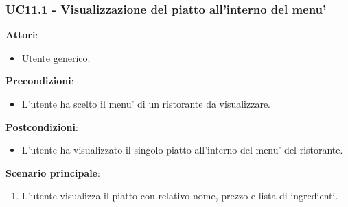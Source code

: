 \subsubsection{UC11.1 - Visualizzazione del piatto all'interno del menu'} \label{usecase:11_1}
\textbf{Attori}:
\begin{itemize}
    \item Utente generico.
\end{itemize}
\textbf{Precondizioni}:
\begin{itemize}
    \item L'utente ha scelto il menu' di un ristorante da visualizzare.
\end{itemize}
\textbf{Postcondizioni}:
\begin{itemize}
    \item L'utente ha visualizzato il singolo piatto all'interno del menu' del ristorante.
\end{itemize}
\textbf{Scenario principale}:
\begin{enumerate}
    \item L'utente visualizza il piatto con relativo nome, prezzo e lista di ingredienti.
\end{enumerate}
\newpage